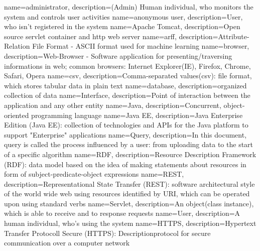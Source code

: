 %
%
{
	name=administrator,
	description={(Admin) Human individual, who monitors the system and controls user activities
}
}
%
{
	name=anonymous user,
	description={User, who isn't registered in the system}
}
%
{
	name=Apache Tomcat,
	description={Open source servlet container and http web server}
}
%
{
	name=arff,
	description={Attribute-Relation File Format - ASCII format used for machine learning}
}
%
{
	name=browser,
	description={Web-Browser - Software application for presenting/traversing informations in web; common browsers: Internet Explorer(IE), Firefox, Chrome, Safari, Opera}
}
%
{
	name=csv,
	description={Comma-separated values(csv): file format, which stores tabular data in plain text}
}
%
{
	name=database,
	description={organized collection of data}
}
%
{
	name=Interface,
	description={Point of interaction between the application and any other entity}
}
%
{
	name=Java,
	description={Concurrent, object-oriented programming language}
}
%
{
	name=Java EE,
	description={Java Enterprise Edition (Java EE): collection of technologies and APIs for the Java platform to support "Enterprise" applications}
}
%
{
	name=Query,
	description={In this document, query is called the process influenced by a user: from uploading data to the start of a specific algorithm }
}
%
{
	name=RDF,
	description={Resource Description Framework (RDF): data model based on the idea of making statements about resources in form of subject-predicate-object expressions }
}
%
{
	name=REST,
	description={Representational State Transfer (REST): software architectural style of the world wide web using resources identified by URI, which can be operated upon using standard verbs}
}
%
{
	name=Servlet,
	description={An object(class instance), which is able to receive and to response requests}
}
%
{
	name=User,
	description={A human individual, who's using the system}
} 
%
{
	name=HTTPS,
	description={Hypertext Transfer Protocoll Secure (HTTPS): Descriptionprotocol for secure communication over a computer network
}
} 
